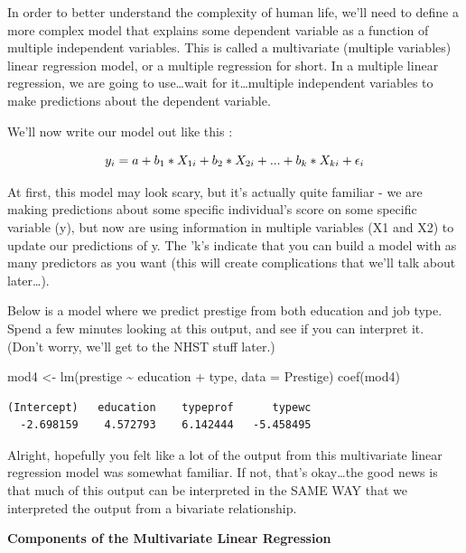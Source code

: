 \documentclass[
  letterpaper,
  DIV=11,
  numbers=noendperiod,
  oneside]{scrreprt}
\newenvironment{Shaded}{\begin{snugshade}}{\end{snugshade}}
\newcommand{\AttributeTok}[1]{\textcolor[rgb]{0.40,0.45,0.13}{#1}}
\newcommand{\FunctionTok}[1]{\textcolor[rgb]{0.28,0.35,0.67}{#1}}
\newcommand{\NormalTok}[1]{\textcolor[rgb]{0.00,0.23,0.31}{#1}}
\newcommand{\OtherTok}[1]{\textcolor[rgb]{0.00,0.23,0.31}{#1}}
\newcommand{\SpecialCharTok}[1]{\textcolor[rgb]{0.37,0.37,0.37}{#1}}
\begin{document}
In order to better understand the complexity of human life, we'll need
to define a more complex model that explains some dependent variable as
a function of multiple independent variables. This is called a
multivariate (multiple variables) linear regression model, or a multiple
regression for short. In a multiple linear regression, we are going to
use\ldots wait for it\ldots multiple independent variables to make
predictions about the dependent variable.~

We'll now write our model out like this :

\[\huge y_i = a + b_1*X_{1i} + b_2*X_{2i} + ... + b_k*X_{ki} + {\epsilon}_i\]

At first, this model may look scary, but it's actually quite familiar -
we are making predictions about some specific individual's score on some
specific variable (y), but now are using information in multiple
variables (X1 and X2) to update our predictions of y. The 'k's indicate
that you can build a model with as many predictors as you want (this
will create complications that we'll talk about later\ldots).

Below is a model where we predict prestige from both education and job
type. Spend a few minutes looking at this output, and see if you can
interpret it. (Don't worry, we'll get to the NHST stuff later.)

\begin{Shaded}
\begin{Highlighting}[]
\NormalTok{mod4 }\OtherTok{\textless{}{-}} \FunctionTok{lm}\NormalTok{(prestige }\SpecialCharTok{\textasciitilde{}}\NormalTok{ education }\SpecialCharTok{+}\NormalTok{ type, }\AttributeTok{data =}\NormalTok{ Prestige)}
\FunctionTok{coef}\NormalTok{(mod4)}
\end{Highlighting}
\end{Shaded}

\begin{verbatim}
(Intercept)   education    typeprof      typewc 
  -2.698159    4.572793    6.142444   -5.458495 
\end{verbatim}

Alright, hopefully you felt like a lot of the output from this
multivariate linear regression model was somewhat familiar. If not,
that's okay\ldots the good news is that much of this output can be
interpreted in the SAME WAY that we interpreted the output from a
bivariate relationship.~

\textbf{Components of the Multivariate Linear Regression}
\end{document}
